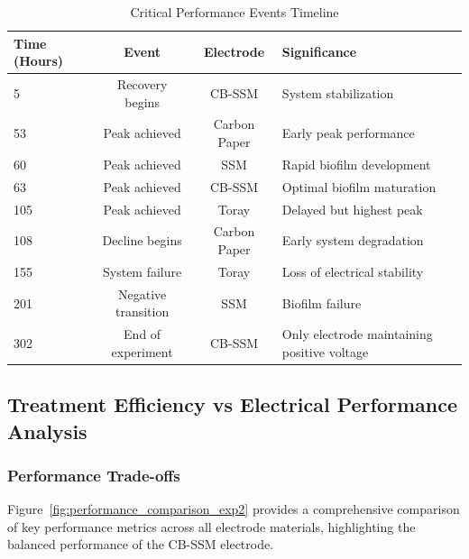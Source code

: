 \documentclass[12pt,a4paper]{article}
\begin{document}
\begin{table}[htbp]
\centering
\caption{Critical Performance Events Timeline}
\label{tab:timeline_events}
\begin{tabular}{@{}lccl@{}}
\toprule
\textbf{Time (Hours)} & \textbf{Event} & \textbf{Electrode} & \textbf{Significance} \\
\midrule
5 & Recovery begins & CB-SSM & System stabilization \\
53 & Peak achieved & Carbon Paper & Early peak performance \\
60 & Peak achieved & SSM & Rapid biofilm development \\
63 & Peak achieved & CB-SSM & Optimal biofilm maturation \\
105 & Peak achieved & Toray & Delayed but highest peak \\
108 & Decline begins & Carbon Paper & Early system degradation \\
155 & System failure & Toray & Loss of electrical stability \\
201 & Negative transition & SSM & Biofilm failure \\
302 & End of experiment & CB-SSM & Only electrode maintaining positive voltage \\
\bottomrule
\end{tabular}
\end{table}

\subsection{Treatment Efficiency vs Electrical Performance Analysis}

\subsubsection{Performance Trade-offs}

Figure~\ref{fig:performance_comparison_exp2} provides a comprehensive comparison of key performance metrics across all electrode materials, highlighting the balanced performance of the CB-SSM electrode.
\end{document}
